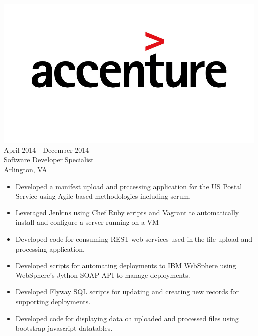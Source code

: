 \documentclass[12pt, line, margin]{res}
\begin{document}
\begin{resume}
	      {\sl  \includegraphics[scale=0.1, trim=110 200 110 120]{resume_images/accenture-logo.jpg}} \hfill April 2014 - December 2014 \\
                Software Developer Specialist \\
                Arlington, VA
                 \begin{itemize}  \itemsep -2pt %
                \item   Developed a manifest upload and processing application for
                               the US Postal Service using Agile based methodologies including scrum.
                \item   Leveraged Jenkins using Chef Ruby scripts and Vagrant\newline
                               to automatically install and configure a server running on a VM
	      \item   Developed code for consuming REST web services used
                               in the file upload and processing application.
	      \item   Developed scripts for automating deployments to IBM WebSphere
                               using WebSphere’s Jython SOAP API to manage deployments.
	      \item   Developed Flyway SQL scripts for updating and creating new 
                               records for supporting deployments.
	      \item   Developed code for displaying data on uploaded and processed
                               files using bootstrap javascript datatables.
                \end{itemize}


\end{resume}
\end{document}
